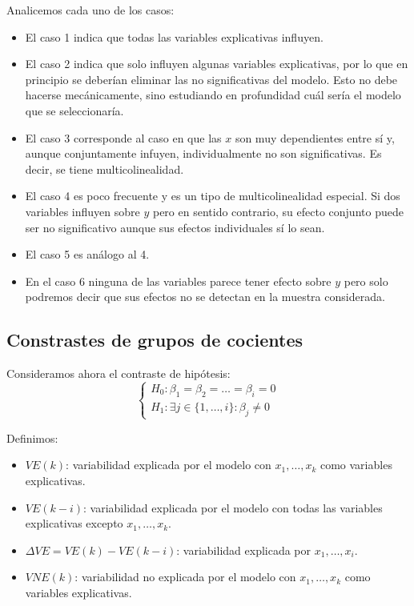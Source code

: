 \documentclass{report}
\theoremstyle{remark}
\theoremstyle{remark}
\theoremstyle{remark}
\theoremstyle{definition}
\theoremstyle{definition}
\theoremstyle{definition}
\begin{document}
Analicemos cada uno de los casos:
\begin{itemize}
    \item El caso 1 indica que todas las variables explicativas influyen.
    \item El caso 2 indica que solo influyen algunas variables explicativas, por lo que en principio se deberían eliminar las no significativas del modelo.
          Esto no debe hacerse mecánicamente, sino estudiando en profundidad cuál sería el modelo que se seleccionaría.
    \item El caso 3 corresponde al caso en que las $x$ son muy dependientes entre sí y, aunque conjuntamente infuyen, individualmente no son significativas.
          Es decir, se tiene multicolinealidad.
    \item El caso 4 es poco frecuente y es un tipo de multicolinealidad especial.
          Si dos variables influyen sobre $y$ pero en sentido contrario, su efecto conjunto puede ser no significativo aunque sus efectos individuales sí lo sean.
    \item El caso 5 es análogo al 4.
    \item En el caso 6 ninguna de las variables parece tener efecto sobre $y$ pero solo podremos decir que sus efectos no se detectan en la muestra considerada.
\end{itemize}

\subsection*{Constrastes de grupos de cocientes}
Consideramos ahora el contraste de hipótesis:
$$\begin{cases}
        H_0: \beta_1 = \beta_2 = \dots = \beta_i = 0 \\
        H_1: \exists j \in \{1, \dots, i\} : \beta_j \neq 0
    \end{cases}$$

Definimos:
\begin{itemize}
    \item $VE(k)$: variabilidad explicada por el modelo con $x_1, \dots, x_k$ como variables explicativas.
    \item $VE(k-i)$: variabilidad explicada por el modelo con todas las variables explicativas excepto $x_1, \dots, x_k$.
    \item $\Delta VE = VE(k) - VE(k-i)$: variabilidad explicada por $x_1, \dots, x_i$.
    \item $VNE(k)$: variabilidad no explicada por el modelo con $x_1, \dots, x_k$ como variables explicativas.
\end{itemize}
\end{document}
